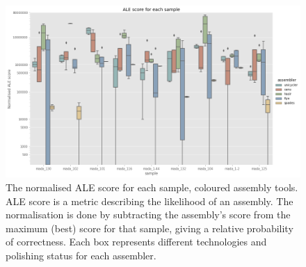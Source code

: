 \begin{figure}
\includegraphics[width=1.0\textwidth]{Chapter2/Figs/ale_score.png}
\centering
\caption{The normalised ALE score for each sample, coloured assembly tools. ALE score is a metric describing the likelihood of an assembly. The normalisation is done by subtracting the assembly's score from the maximum (best) score for that sample, giving a relative probability of correctness. Each box represents different technologies and polishing status for each assembler.}
\label{fig:ale_score}
\end{figure}

